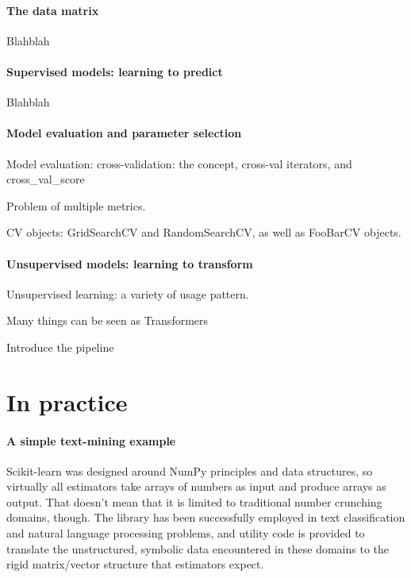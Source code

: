 \documentclass[a4paper]{article}
\begin{document}
\paragraph{The data matrix}
%
Blahblah

\paragraph{Supervised models: learning to predict}
%
Blahblah

\paragraph{Model evaluation and parameter selection}
%
Model evaluation:
cross-validation: the concept, cross-val iterators, and cross\_val\_score

Problem of multiple metrics.

CV objects: GridSearchCV and RandomSearchCV, as well as FooBarCV objects.

\paragraph{Unsupervised models: learning to transform}
%
Unsupervised learning: a variety of usage pattern.

Many things can be seen as Transformers

Introduce the pipeline

\section{In practice}

\paragraph{A simple text-mining example}
%

Scikit-learn was designed around NumPy principles and data structures,
so virtually all estimators take arrays of numbers as input
and produce arrays as output.
That doesn't mean that it is limited to traditional number crunching domains,
though.
The library has been successfully employed in text classification
and natural language processing problems,
and utility code is provided to translate the unstructured, symbolic data
encountered in these domains
to the rigid matrix/vector structure that estimators expect.
\end{document}
